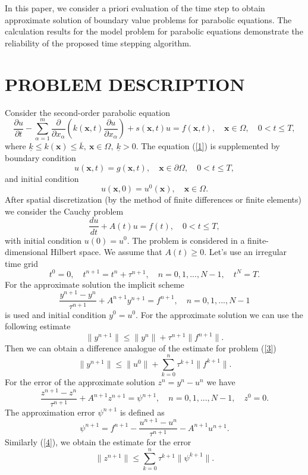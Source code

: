 \documentclass{aip-cp}
\begin{document}
In this paper, we consider a priori evaluation of the time step to obtain approximate solution of boundary value problems for parabolic equations. The calculation results for the model problem for parabolic equations demonstrate the reliability of the proposed time stepping algorithm.

\section{PROBLEM DESCRIPTION}
Consider the second-order parabolic equation
\begin{equation}\label{1}
   \frac{\partial u}{\partial t} 
   - \sum_{\alpha =1}^{m}
   \frac{\partial }{\partial x_\alpha} 
   \left ( k({\bm x},t)  \frac{\partial u}{\partial x_\alpha} \right ) + s({\bm x},t) u = f({\bm x},t),
   \quad {\bm x}\in \Omega,
   \quad 0 < t \leq  T,
\end{equation}
where
$\underline{k} \leq k({\bm x}) \leq  \overline{k}, \ {\bm x} \in \Omega, \ \underline{k} > 0$.
The equation (\ref{1}) is supplemented by boundary  condition
\[
   u({\bm x},t) = g({\bm x},t),
   \quad {\bm x}\in \partial \Omega,
   \quad 0 < t \leq  T,
\]
and initial condition
\[
   u({\bm x},0) = u^0({\bm x}),
   \quad {\bm x}\in \Omega.
\]
After spatial discretization (by the method of finite differences or finite elements) we consider the Cauchy problem
\begin{equation}\label{2}
\frac{du}{dt} + A(t)u =f(t), \quad 0 < t \leq T,
\end{equation}
with initial condition $u(0) = u^0$. 
The problem is considered in a finite-dimensional Hilbert space.
We assume that $A(t) \geq 0$.
Let's use an irregular time grid
\[
t^0 = 0, \quad t^{n+1} = t^n + \tau^{n+1}, \quad 
n = 0, 1, ... , N-1, \quad t^N = T.
\]
For the approximate solution the implicit scheme 
\begin{equation}\label{3}
  \frac{y^{n+1} - y^{n}}{\tau^{n+1}} + A^{n+1} y^{n+1} = f^{n+1},
  \quad n = 0,1, ..., N-1
\end{equation}
is used and initial condition 
$
y^0 = u^0 .
$
For the approximate solution we can use the following estimate
\[
 \|y^{n+1}\| \leq \|y^{n}\| + \tau^{n+1} \|f^{n+1}\| .
\]
Then we can obtain a difference analogue of the estimate for problem (\ref{3})
\begin{equation}\label{4}
 \|y^{n+1}\| \leq \|u^{0}\| + \sum_{k=0}^{n} \tau^{k+1} \|f^{k+1}\|.
\end{equation}
For the error of the approximate solution $z^n = y^n - u^n$ we have
\[
  \frac{z^{n+1} - z^{n}}{\tau^{n+1}} + A^{n+1} z^{n+1} = \psi^{n+1},
  \quad n = 0,1, ..., N-1,  \quad
 z^0 = 0.
\]
The approximation error $\psi^{n+1}$ is defined as
\begin{equation}\label{5}
 \psi^{n+1} = f^{n+1} -
 \frac{u^{n+1} - u^{n}}{\tau^{n+1}} - A^{n+1} u^{n+1} . 
\end{equation}
Similarly (\ref{4}), we obtain the estimate for the error
\begin{equation}\label{6}
  \|z^{n+1}\| \leq \sum_{k=0}^{n} \tau^{k+1} \|\psi^{k+1}\| .
\end{equation} 
\end{document}
